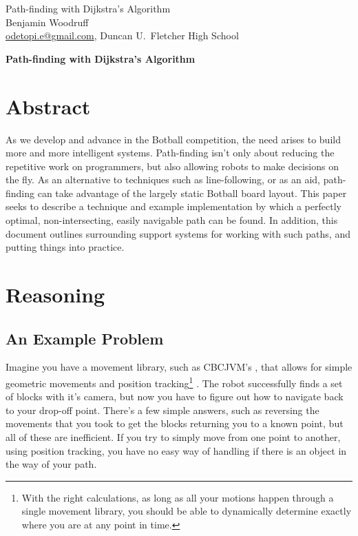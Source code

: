 \documentclass[letterpaper, 12pt]{article}
\begin{document}
\begin{flushleft}
Path-finding with Dijkstra's Algorithm\\
Benjamin Woodruff\\
\href{mailto:odetopi.e@gmail.com}{odetopi.e@gmail.com},
Duncan U.~Fletcher High School
\end{flushleft}

\vspace{0.25in}

\begin{huge}
    \begin{center}
        \textbf{Path-finding with Dijkstra's Algorithm}
    \end{center}
\end{huge}
\vspace{.5in}

\begin{multicols}{2}

\section{Abstract}

As we develop and advance in the Botball competition, the need arises to build
more and more intelligent systems. Path-finding isn't only about reducing the
repetitive work on programmers, but also allowing robots to make decisions on
the fly. As an alternative to techniques such as line-following, or as an aid,
path-finding can take advantage of the largely static Botball board layout. This
paper seeks to describe a technique and example implementation by which a
perfectly optimal, non-intersecting, easily navigable path can be found. In
addition, this document outlines surrounding support systems for working with
such paths, and putting things into practice.

\section{Reasoning}

\subsection{An Example Problem}

Imagine you have a movement library, such as CBCJVM's \cite{cbcjvm2010}, that
allows for simple geometric movements and position tracking\footnote{With the
right calculations, as long as all your motions happen through a single movement
library, you should be able to dynamically determine exactly where you are at
any point in time.} \cite{cbcjvmposition}. The robot successfully finds a set of
blocks with it's camera, but now you have to figure out how to navigate back to
your drop-off point. There's a few simple answers, such as reversing the
movements that you took to get the blocks returning you to a known point, but
all of these are inefficient. If you try to simply move from one point to
another, using position tracking, you have no easy way of handling if there is
an object in the way of your path.


\end{multicols}
\end{document}
